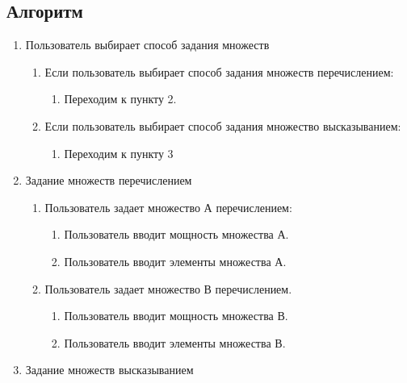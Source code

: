 \documentclass[a4paper,12pt]{extarticle}
\begin{document}
\begin{center}
\section*{Алгоритм}
\end{center}
\begin{enumerate}
  \item Пользователь выбирает способ задания множеств
  \begin{enumerate}[label*=\arabic*.]
    \item Если пользователь выбирает способ задания множеств перечислением:
    \begin{enumerate}[label*=\arabic*.]
      \item Переходим к пункту 2.
    \end{enumerate}
    \item Если пользователь выбирает способ задания множество высказыванием:
    \begin{enumerate}[label*=\arabic*.]
      \item Переходим к пункту 3
    \end{enumerate}
  \end{enumerate}
  \item Задание множеств перечислением
  \begin{enumerate}[label*=\arabic*.]
    \item Пользователь задает множество А перечислением:
    \begin{enumerate}[label*=\arabic*.]
      \item Пользователь вводит мощность множества А.
      \item Пользователь вводит элементы множества А.
    \end{enumerate}
    \item Пользователь задает множество В перечислением.
    \begin{enumerate}[label*=\arabic*.]
      \item Пользователь вводит мощность множества В.
      \item Пользователь вводит элементы множества В.
    \end{enumerate}
  \end{enumerate}
  \item Задание множеств высказыванием
  \begin{enumerate}[label*=\arabic*.]

\end{enumerate}
\end{enumerate}
\end{document}
